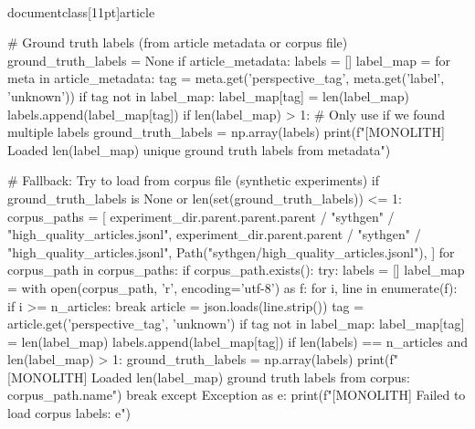 \\documentclass[11pt]{article}
\begin{document}
\begin{CodeBlock}
    # Ground truth labels (from article metadata or corpus file)
    ground_truth_labels = None
    if article_metadata:
        labels = []
        label_map = {}
        for meta in article_metadata:
            tag = meta.get('perspective_tag', meta.get('label', 'unknown'))
            if tag not in label_map:
                label_map[tag] = len(label_map)
            labels.append(label_map[tag])
        if len(label_map) > 1:  # Only use if we found multiple labels
            ground_truth_labels = np.array(labels)
            print(f"[MONOLITH] Loaded {len(label_map)} unique ground truth labels from metadata")

    # Fallback: Try to load from corpus file (synthetic experiments)
    if ground_truth_labels is None or len(set(ground_truth_labels)) <= 1:
        corpus_paths = [
            experiment_dir.parent.parent.parent / "sythgen" / "high_quality_articles.jsonl",
            experiment_dir.parent.parent / "sythgen" / "high_quality_articles.jsonl",
            Path("sythgen/high_quality_articles.jsonl"),
        ]
        for corpus_path in corpus_paths:
            if corpus_path.exists():
                try:
                    labels = []
                    label_map = {}
                    with open(corpus_path, 'r', encoding='utf-8') as f:
                        for i, line in enumerate(f):
                            if i >= n_articles:
                                break
                            article = json.loads(line.strip())
                            tag = article.get('perspective_tag', 'unknown')
                            if tag not in label_map:
                                label_map[tag] = len(label_map)
                            labels.append(label_map[tag])
                    if len(labels) == n_articles and len(label_map) > 1:
                        ground_truth_labels = np.array(labels)
                        print(f"[MONOLITH] Loaded {len(label_map)} ground truth labels from corpus: {corpus_path.name}")
                        break
                except Exception as e:
                    print(f"[MONOLITH] Failed to load corpus labels: {e}")


\end{CodeBlock}
\end{document}
